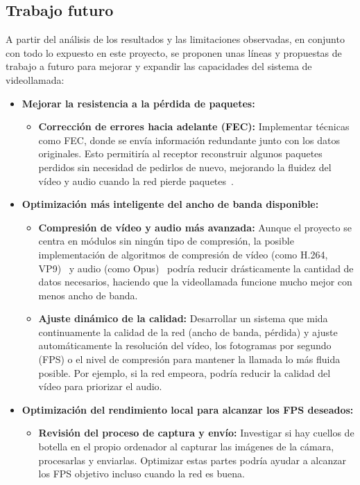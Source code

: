 \newpage

\subsection{Trabajo futuro}
A partir del análisis de los resultados y las limitaciones observadas, en conjunto con todo lo expuesto en este proyecto, se proponen unas líneas y propuestas de trabajo a futuro para mejorar y expandir las capacidades del sistema de videollamada:

\begin{itemize}
\item \textbf{Mejorar la resistencia a la pérdida de paquetes:}
\begin{itemize}
\item \textbf{Corrección de errores hacia adelante (FEC):} Implementar técnicas como FEC, donde se envía información redundante junto con los datos originales. Esto permitiría al receptor reconstruir algunos paquetes perdidos sin necesidad de pedirlos de nuevo, mejorando la fluidez del vídeo y audio cuando la red pierde paquetes~\cite{fec}.
\end{itemize}
\item \textbf{Optimización más inteligente del ancho de banda disponible:}
\begin{itemize}
    \item \textbf{Compresión de vídeo y audio más avanzada:} Aunque el proyecto se centra en módulos sin ningún tipo de compresión, la posible implementación de algoritmos de compresión de vídeo (como H.264, VP9)~\cite{h264} y audio (como Opus)~\cite{opus} podría reducir drásticamente la cantidad de datos necesarios, haciendo que la videollamada funcione mucho mejor con menos ancho de banda.
    \item \textbf{Ajuste dinámico de la calidad:} Desarrollar un sistema que mida continuamente la calidad de la red (ancho de banda, pérdida) y ajuste automáticamente la resolución del vídeo, los fotogramas por segundo (FPS) o el nivel de compresión para mantener la llamada lo más fluida posible. Por ejemplo, si la red empeora, podría reducir la calidad del vídeo para priorizar el audio.
\end{itemize}

\item \textbf{Optimización del rendimiento local para alcanzar los FPS deseados:}
\begin{itemize}
    \item \textbf{Revisión del proceso de captura y envío:} Investigar si hay cuellos de botella en el propio ordenador al capturar las imágenes de la cámara, procesarlas y enviarlas. Optimizar estas partes podría ayudar a alcanzar los FPS objetivo incluso cuando la red es buena.
\end{itemize}


\end{itemize}
